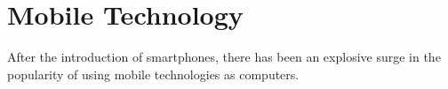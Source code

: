 \section{Mobile Technology}

After the introduction of smartphones, there has been an explosive surge in the
popularity of using mobile technologies as computers.
\begin{figure}[!ht]
\centering
{}
\subfigure{
}
\end{figure}
